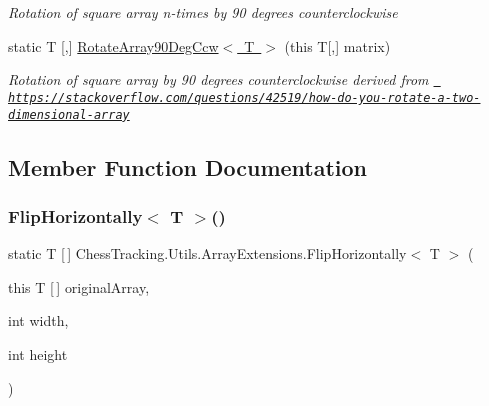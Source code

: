 \begin{DoxyCompactItemize}
\begin{DoxyCompactList}\small\item\em Rotation of square array n-\/times by 90 degrees counterclockwise \end{DoxyCompactList}\item 
static T \mbox{[},\mbox{]} \mbox{\hyperlink{class_chess_tracking_1_1_utils_1_1_array_extensions_a046ba68618e1cd3ed9e581ff5f753b3e}{Rotate\+Array90\+Deg\+Ccw$<$ T $>$}} (this T\mbox{[},\mbox{]} matrix)
\begin{DoxyCompactList}\small\item\em Rotation of square array by 90 degrees counterclockwise derived from \href{https://stackoverflow.com/questions/42519/how-do-you-rotate-a-two-dimensional-array}{\texttt{ https\+://stackoverflow.\+com/questions/42519/how-\/do-\/you-\/rotate-\/a-\/two-\/dimensional-\/array}} \end{DoxyCompactList}\end{DoxyCompactItemize}


\subsection{Member Function Documentation}
\mbox{\label{class_chess_tracking_1_1_utils_1_1_array_extensions_a7ee8db3a5c02ab354c3f555f2105399c}} 
\subsubsection{\texorpdfstring{FlipHorizontally$<$ T $>$()}{FlipHorizontally< T >()}\hspace{0.1cm}{\footnotesize\ttfamily [1/3]}}
{\footnotesize\ttfamily static T \mbox{[}$\,$\mbox{]} Chess\+Tracking.\+Utils.\+Array\+Extensions.\+Flip\+Horizontally$<$ T $>$ (\begin{DoxyParamCaption}\item[{this T \mbox{[}$\,$\mbox{]}}]{original\+Array,  }\item[{int}]{width,  }\item[{int}]{height }\end{DoxyParamCaption})\hspace{0.3cm}{\ttfamily [static]}}



